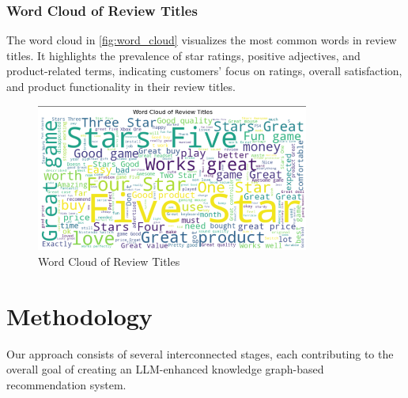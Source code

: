 \documentclass{article}
\begin{document}
\subsubsection{Word Cloud of Review Titles}

The word cloud in \autoref{fig:word_cloud} visualizes the most common words in review titles. It highlights the prevalence of star ratings, positive adjectives, and product-related terms, indicating customers' focus on ratings, overall satisfaction, and product functionality in their review titles.
\begin{figure}[H]
\centering
\includegraphics[width=0.8\textwidth]{img/wordcloud.png}
\caption{Word Cloud of Review Titles}
\label{fig:word_cloud}
\end{figure}

\section{Methodology}
Our approach consists of several interconnected stages, each contributing to the overall goal of creating an LLM-enhanced knowledge graph-based recommendation system. 
\end{document}

